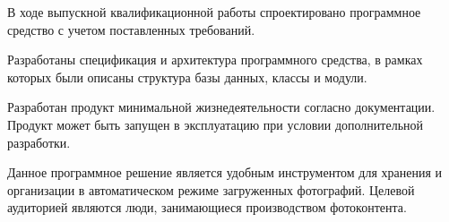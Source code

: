 
В ходе выпускной квалификационной работы спроектировано программное средство с учетом поставленных требований. 

Разработаны спецификация и архитектура программного средства, в рамках которых были описаны структура базы данных, классы и модули.

Разработан продукт минимальной жизнедеятельности согласно документации.
Продукт может быть запущен в эксплуатацию при условии дополнительной разработки.

Данное программное решение является удобным инструментом для хранения и организации в автоматическом режиме загруженных фотографий. 
Целевой аудиторией являются люди, занимающиеся производством фотоконтента.

\clearpage